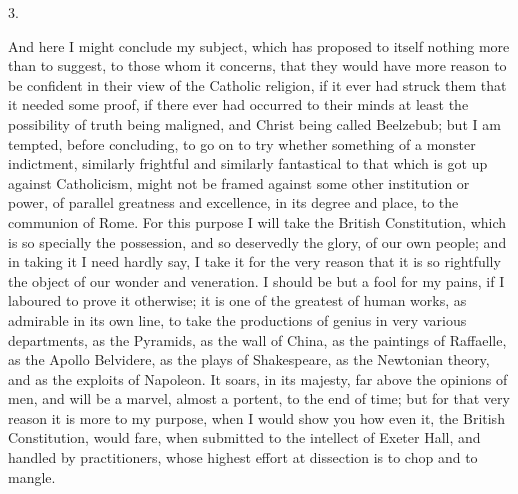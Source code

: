 3.

And here I might conclude my subject, which has
proposed to itself nothing more than to suggest, to those
whom it concerns, that they would have more reason to be
confident in their view of the Catholic religion, if it
ever had struck them that it needed some proof, if there
ever had occurred to their minds at least the possibility
of truth being maligned, and Christ being called
Beelzebub; but I am tempted, before concluding, to go on
to try whether something of a monster indictment,
similarly frightful and similarly fantastical to that
which is got up against Catholicism, might not be framed
against some other institution or power, of parallel
greatness and excellence, in its degree and place, to the
communion of Rome. For this purpose I will take the
British Constitution, which is so specially the
possession, and so deservedly the glory, of our own
people; and in taking it I need hardly say, I take it for
the very reason that it is so rightfully the object of
our wonder and veneration. I should be but a fool for my
pains, if I laboured to prove it otherwise; it is one of
the greatest of human works, as admirable in its own
line, to take the productions of genius in very various
departments, as the Pyramids, as the wall of China, as
the paintings of Raffaelle, as the Apollo Belvidere, as
the plays of Shakespeare, as the Newtonian theory, and as
the exploits of Napoleon. It soars, in its majesty, far
above the opinions of men, and will be a marvel, almost a
portent, to the end of time; but for that very reason it
is more to my purpose, when I would show you how even it,
the British Constitution, would fare, when submitted to
the intellect of Exeter Hall, and handled by
practitioners, whose highest effort at dissection is to
chop and to mangle.

